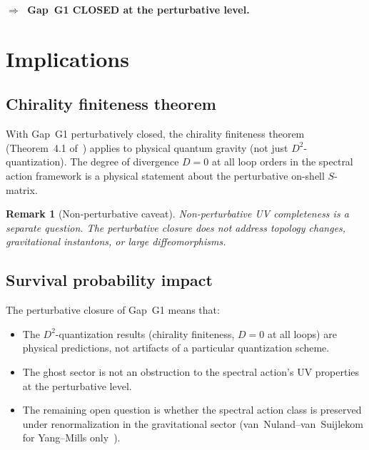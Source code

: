 \documentclass[11pt,a4paper]{article}
\newtheorem{remark}[theorem]{Remark}
\begin{document}
\medskip
\noindent
$\Longrightarrow\;$ \textbf{Gap~G1 CLOSED at the perturbative level.}

\section{Implications}
\label{sec:implications}

\subsection{Chirality finiteness theorem}

With Gap~G1 perturbatively closed, the chirality finiteness theorem
(Theorem~4.1 of~\cite{SCTchiralQ}) applies to physical quantum gravity
(not just $D^2$-quantization).  The degree of divergence $D = 0$ at all
loop orders in the spectral action framework is a physical statement
about the perturbative on-shell $S$-matrix.

\begin{remark}[Non-perturbative caveat]
Non-perturbative UV completeness is a separate question.
The perturbative closure does not address topology changes,
gravitational instantons, or large diffeomorphisms.
\end{remark}

\subsection{Survival probability impact}

The perturbative closure of Gap~G1 means that:
\begin{itemize}
  \item The $D^2$-quantization results (chirality finiteness,
    $D = 0$ at all loops) are physical predictions, not artifacts
    of a particular quantization scheme.
  \item The ghost sector is not an obstruction to the spectral
    action's UV properties at the perturbative level.
  \item The remaining open question is whether the spectral action
    class is preserved under renormalization in the gravitational
    sector (van~Nuland--van~Suijlekom for Yang--Mills
    only~\cite{vNvS2022}).
\end{itemize}

\end{document}
